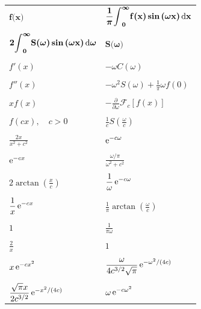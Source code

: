 \setlongtables
\begin{longtable}{ll}
  $\displaystyle \mathbf{f \boldsymbol{(} x \boldsymbol{)} }$
  & $\displaystyle \mathbf{\frac{1}{\boldsymbol{\pi}} \boldsymbol{\int}_0^{\boldsymbol{\infty}} f \boldsymbol{(} x \boldsymbol{)} 
    \mathop{\mathbf{sin}}\nolimits \boldsymbol{(} \boldsymbol{\omega} x \boldsymbol{)} \,\mathrm{d} x}$ \\
  \\
  $\displaystyle \mathbf{2 \boldsymbol{\int}_0^{\boldsymbol{\infty}} S\boldsymbol{(} \boldsymbol{\omega} \boldsymbol{)} 
    \mathop{\mathbf{sin}}\nolimits\boldsymbol{(}\boldsymbol{\omega} x \boldsymbol{)}\,\mathrm{d} \boldsymbol{\omega}}$
  & $\displaystyle \mathbf{S \boldsymbol{(} \boldsymbol{\omega} \boldsymbol{)}}$ \\
  \\
  $\displaystyle f'(x)$
  & $\displaystyle - \omega C(\omega)$ \\
  \\
  $\displaystyle f''(x)$
  & $\displaystyle -\omega^2 S(\omega) + \frac{1}{\pi} \omega f(0)$ \\
  \\
  $\displaystyle x f(x)$
  & $\displaystyle -\frac{\partial}{\partial \omega} \mathcal{F}_c [f(x)]$ \\
  \\
  $\displaystyle f(c x), \quad c > 0$
  & $\displaystyle \frac{1}{c} S\left(\frac{\omega}{c}\right)$ \\
  \\
  $\displaystyle \frac{2x}{x^2 + c^2}$
  & $\displaystyle \mathop{\mathrm{e}}\nolimits^{-c \omega}$ \\
  \\
  $\displaystyle \mathop{\mathrm{e}}\nolimits^{-c x}$
  & $\displaystyle \frac{\omega/\pi}{\omega^2 + c^2}$ \\
  \\
  $\displaystyle 2 \arctan \left( \frac{x}{c} \right)$ 
  & $\displaystyle \frac{1}{\omega} \mathop{\mathrm{e}}\nolimits^{-c \omega}$ \\
  \\
  $\displaystyle \frac{1}{x} \mathop{\mathrm{e}}\nolimits^{-c x}$
  & $\displaystyle \frac{1}{\pi} \arctan\left( \frac{\omega}{c} \right)$ \\
  \\
  $\displaystyle 1$
  & $\displaystyle \frac{1}{\pi \omega}$ \\
  \\
  $\displaystyle \frac{2}{x}$
  & $\displaystyle 1$ \\
  \\
  $\displaystyle x \mathop{\mathrm{e}}\nolimits^{-c x^2}$
  & $\displaystyle \frac{\omega}{4 c^{3/2} \sqrt{\pi}} \mathop{\mathrm{e}}\nolimits^{-\omega^2/(4 c)}$ \\
  \\
  $\displaystyle \frac{\sqrt{\pi} x}{2 c^{3/2}} \mathop{\mathrm{e}}\nolimits^{-x^2 / (4 c)}$
  & $\displaystyle \omega \mathop{\mathrm{e}}\nolimits^{-c \omega^2}$
\end{longtable}













